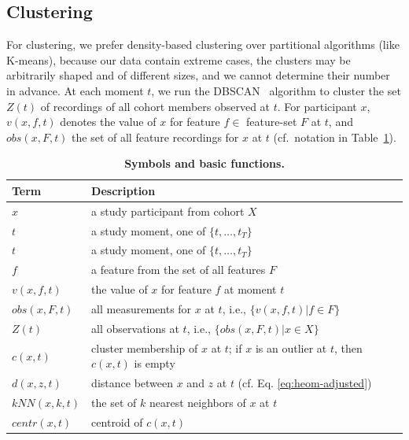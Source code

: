 \documentclass[
  oneside]{book}
\begin{document}
\hypertarget{evo-concept-clustering}{%
\subsection{Clustering}\label{evo-concept-clustering}}

For clustering, we prefer density-based clustering over partitional algorithms (like K-means), because our data contain extreme cases, the clusters may be arbitrarily shaped and of different sizes, and we cannot determine their number in advance.
At each moment \(t\), we run the DBSCAN~\autocite{EsterEtAl:DBSCAN96} algorithm to cluster the set \(Z(t)\) of recordings of all cohort members observed at \(t\).
For participant \(x\), \(v(x,f,t)\) denotes the value of \(x\) for feature \(f\in\) feature-set \(F\) at \(t\), and \(obs(x,F,t)\) the set of all feature recordings for \(x\) at \(t\) (cf.~notation in Table~\ref{tab:07-nomenclature}).



\begin{table}

\caption{\label{tab:07-nomenclature}\textbf{Symbols and basic functions.}}
\centering
\begin{tabular}[t]{ll}
\toprule
\textbf{Term} & \textbf{Description}\\
\midrule
$x$ & a study participant from cohort $X$\\
$t$ & a study moment, one of \vphantom{1} $\{t,\ldots,t_T\}$\\
$t$ & a study moment, one of $\{t,\ldots,t_T\}$\\
$f$ & a feature from the set of all features $F$\\
$v(x,f,t)$ & the value of $x$ for feature $f$ at moment $t$\\
$obs(x,F,t)$ & all measurements for $x$ at $t$, i.e., $\{v(x,f,t)|f\in{}F\}$\\
$Z(t)$ & all observations at $t$, i.e., $\{obs(x,F,t)| x \in X\}$\\
$c(x,t)$ & cluster membership of $x$ at $t$; if $x$ is an outlier at $t$, then $c(x,t)$ is empty\\
$d(x,z,t)$ & distance between $x$ and $z$ at $t$ (cf. Eq. \ref{eq:heom-adjusted})\\
$kNN(x,k,t)$ & the set of $k$ nearest neighbors of $x$ at  $t$\\
$centr(x,t)$ & centroid of $c(x,t)$\\
\bottomrule
\end{tabular}
\end{table}
\end{document}

